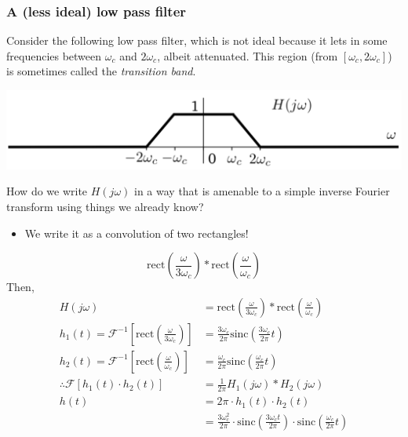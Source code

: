 \documentclass[10pt]{article}
\newcommand{\sinc}{\text{sinc}}
\newcommand{\rect}{\text{rect}}
\newcommand{\fourier}{\mathcal{F}}
\begin{document}
\subsubsection*{A (less ideal) low pass filter}
Consider the following low pass filter, which is not ideal because it lets in some frequencies between $\omega_c$ and $2\omega_c$, albeit attenuated.  This region (from $[\omega_c, 2\omega_c]$) is sometimes called the \textit{transition band}.
\begin{center}
    \includegraphics[width=\textwidth]{W7_6.png}
\end{center}
How do we write $H(j\omega)$ in a way that is amenable to a simple inverse Fourier transform using things we already know?
\begin{itemize}
    \item We write it as a convolution of two rectangles!
\end{itemize}
\[\rect\left(\frac{\omega}{3\omega_c}\right) * \rect\left(\frac{\omega}{\omega_c}\right)\]
Then, 
\begin{align*}
    H(j\omega) &= \rect\left(\frac{\omega}{3\omega_c}\right) * \rect\left(\frac{\omega}{\omega_c}\right)\\
    h_1(t) = \fourier^{-1}\left[\rect\left(\frac{\omega}{3\omega_c}\right)\right] &= \frac{3\omega_c}{2\pi} \sinc\left(\frac{3\omega_c}{2\pi}t\right)\\
    h_2(t) = \fourier^{-1}\left[\rect\left(\frac{\omega}{\omega_c}\right)\right] &= \frac{\omega_c}{2\pi} \sinc\left(\frac{\omega_c}{2\pi}t\right)\\
    \therefore \fourier[h_1(t) \cdot h_2(t)] &= \frac{1}{2\pi} H_1(j\omega) * H_2(j\omega)\\
    h(t) &= 2\pi \cdot h_1(t) \cdot h_2(t)\\
    &= \frac{3\omega_c^2}{2\pi} \cdot \sinc\left(\frac{3\omega_c t}{2\pi}\right) \cdot \sinc\left(\frac{\omega_c}{2\pi} t\right)
\end{align*} 
\end{document}
